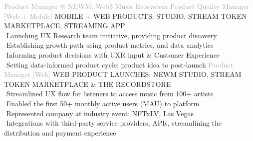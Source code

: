 \begin{cvtable}
    {\textcolor{darkgray} {Product Manager \newline @ NEWM: Web3 Music Ecosystem } }
    { }{{ {    } }}
%
    {\textcolor{darkgray}
    {
    Product Quality Manager [Web + Mobile] %
    }
    }
    { }%
    {
    {
    {\scriptsize
    MOBILE + WEB PRODUCTS:
    STUDIO, STREAM TOKEN MARKETPLACE, STREAMING APP
    } \\
        \textperiodcentered $ $ Launching UX Research team initiative,
providing product discovery \\
     \textperiodcentered $ $ Establishing growth path using product metrics, and data analytics \\
          \textperiodcentered $ $ Informing product decisions
          with UXR input \& Customer Experience
          \\
     \textperiodcentered $ $ Setting data-informed product cycle:
     product idea to post-launch %
    }}
%
%
    {\textcolor{darkgray}{
    Product 
    Manager
    [Web]
    }}%
    {
    }%
    {%
    {\scriptsize
    WEB
    PRODUCT
    LAUNCHES: NEWM STUDIO, STREAM TOKEN MARKETPLACE \& THE RECORDSTORE} \\
\textperiodcentered $ $ Streamlined UX flow for listeners to access music from 100+ artists \\
\textperiodcentered $ $ Enabled the first 50+ monthly active users (MAU) to platform \\
\textperiodcentered $ $
  Represented company %
  at industry event: NFTxLV, Las Vegas \\
\textperiodcentered $ $
Integrations with third-party service providers,
APIs,
  streamlining the distribution and payment experience %
} \\


\end{cvtable}
